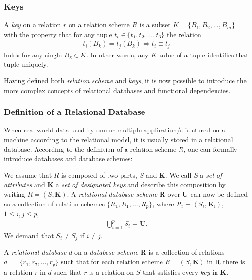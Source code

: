 \subsubsection{Keys}
A \emph{key} on a relation \( r \) on a relation scheme \( R \) is a subset \( K = \{ B_1, B_2, \dots, B_m \} \) with the property that for any tuple \( t_i \in \{ t_1, t_2, \dots, t_3 \} \) the relation
\begin{align*}
    t_i(B_k) = t_j(B_k) \Rightarrow t_i \equiv t_j
\end{align*}
holds for any single \( B_k \in K \). In other words, any \( K \)-value of a tuple identifies that tuple uniquely.~\cite[p.~4]{MAI83}

Having defined both \emph{relation scheme} and \emph{keys}, it is now possible to introduce the more complex concepts of relational databases and functional dependencies.


\subsubsection{Definition of a Relational Database}
When real-world data used by one or multiple application/s is stored on a machine according to the relational model, it is usually stored in a relational database.
According to the definition of a relation scheme \(R\), one can formally introduce databases and database schemes:

We assume that \(R\) is composed of two parts, \(S\) and \(\boldsymbol{K}\). We call \(S\) a \emph{set of attributes} and \(\boldsymbol{K}\) a \emph{set of designated keys} and describe this composition by writing \(R = (S, \boldsymbol{K})\).
A \emph{relational database scheme} \textbf{R} over \textbf{U} can now be defined as a collection of relation schemes \(\{R_1, R_1, \dots, R_p\}\), where \(R_i = (S_i, \boldsymbol{K}_i)\), \(1 \leq i, j \leq p\),
\begin{align*}
    \bigcup^{p}_{i=1} S_i = \boldsymbol{U}.
\end{align*}
We demand that \(S_i \neq S_j\) if \(i \neq j\).

A \emph{relational database} \( d \) on a \emph{database scheme} \textbf{R} is a collection of relations \( d~=~\{r_1, r_2, \dots, r_p \} \) such that for each relation scheme \(R = (S, \boldsymbol{K}) \) in \textbf{R} there is a relation \(r\) in \(d\) such that \(r\) is a relation on \(S\) that satisfies every \emph{key} in \(\boldsymbol{K}\).~\cite[p.~94]{MAI83}


